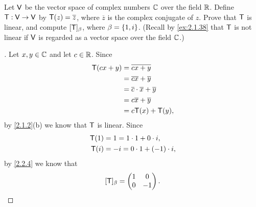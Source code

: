 \begin{ex}\label{ex:2.2.9}
  Let \(\mathsf{V}\) be the vector space of complex numbers \(\mathbb{C}\) over the field \(\mathbb{R}\).
  Define \(\mathsf{T} : \mathsf{V} \to \mathsf{V}\) by \(\mathsf{T}(z) = \overline{z}\), where \(\overline{z}\) is the complex conjugate of \(z\).
  Prove that \(\mathsf{T}\) is linear, and compute \([\mathsf{T}]_{\beta}\), where \(\beta = \left\lbrace1, i\right\rbrace\).
  (Recall by \cref{ex:2.1.38} that \(\mathsf{T}\) is not linear if \(\mathsf{V}\) is regarded as a vector space over the field \(\mathbb{C}\).)
\end{ex}

\begin{proof}[]
  Let \(x, y \in \mathbb{C}\) and let \(c \in \mathbb{R}\).
  Since
  \begin{align*}
    \mathsf{T}(cx + y) & = \overline{cx + y}                              \\
               & = \overline{cx} + \overline{y}                   \\
               & = \overline{c} \cdot \overline{x} + \overline{y} \\
               & = c \overline{x} + \overline{y}                  \\
               & = c \mathsf{T}(x) + \mathsf{T}(y),
  \end{align*}
  by \cref{2.1.2}(b) we know that \(\mathsf{T}\) is linear.
  Since
  \begin{align*}
    \mathsf{T}(1) & = 1 = 1 \cdot 1 + 0 \cdot i,     \\
    \mathsf{T}(i) & = -i = 0 \cdot 1 + (-1) \cdot i,
  \end{align*}
  by \cref{2.2.4} we know that
  \[
    [\mathsf{T}]_{\beta} = \begin{pmatrix}
      1 & 0  \\
      0 & -1
    \end{pmatrix}.
  \]
\end{proof}
